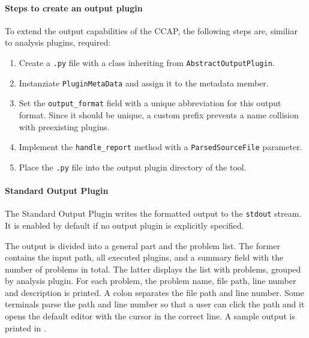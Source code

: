 \paragraph{Steps to create an output plugin}
To extend the output capabilities of the CCAP, the following steps are, similiar to analysis plugins, required:
\begin{enumerate}
    \item Create a \texttt{.py} file with a class inheriting from \texttt{AbstractOutputPlugin}.
    \item Instanziate \texttt{PluginMetaData} and assign it to the metadata member.
    \item Set the \texttt{output\_format} field with a unique abbreviation for this output format. Since it should be unique, a custom prefix prevents a name collision with preexisting plugins.
    \item Implement the \texttt{handle\_report} method with a \texttt{ParsedSourceFile} parameter. 
    \item Place the \texttt{.py} file into the output plugin directory of the tool.
\end{enumerate}

\paragraph{Standard Output Plugin}
The Standard Output Plugin writes the formatted output to the \texttt{stdout} stream. It is enabled by default if no output plugin is explicitly specified. 

The output is divided into a general part and the problem list. The former contains the input path, all executed plugins, and a summary field with the number of problems in total. The latter displays the list with problems, grouped by analysis plugin.  
For each problem, the problem name, file path, line number and description is printed. A colon separates the file path and line number. Some terminals parse the path and line number so that a user can click the path and it opens the default editor with the cursor in the correct line. A sample output is printed in .

